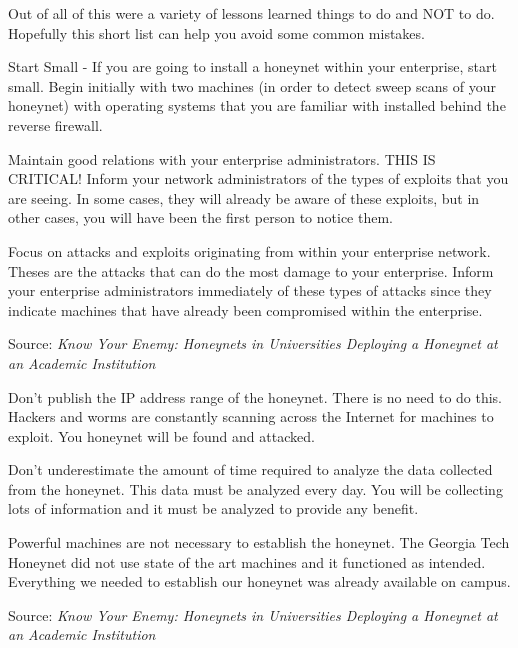 \documentclass[Screen16to9,17pt]{foils}
\begin{document}
Out of all of this were a variety of lessons learned things to do and NOT to do. Hopefully this short list can help you avoid some common mistakes.
\begin{list2}
\item Start Small - If you are going to install a honeynet within your enterprise, start small. Begin initially with two machines (in order to detect sweep scans of your honeynet) with operating systems that you are familiar with installed behind the reverse firewall.
\item Maintain good relations with your enterprise administrators. THIS IS CRITICAL! Inform your network administrators of the types of exploits that you are seeing. In some cases, they will already be aware of these exploits, but in other cases, you will have been the first person to notice them.
\item Focus on attacks and exploits originating from within your enterprise network. Theses are the attacks that can do the most damage to your enterprise. Inform your enterprise administrators immediately of these types of attacks since they indicate machines that have already been compromised within the enterprise.
\end{list2}


Source: \emph{Know Your Enemy: Honeynets in Universities Deploying a Honeynet at an Academic Institution}

\begin{list2}
\item Don't publish the IP address range of the honeynet. There is no need to do this. Hackers and worms are constantly scanning across the Internet for machines to exploit. You honeynet will be found and attacked.
\item Don't underestimate the amount of time required to analyze the data collected from the honeynet. This data must be analyzed every day. You will be collecting lots of information and it must be analyzed to provide any benefit.
\item Powerful machines are not necessary to establish the honeynet. The Georgia Tech Honeynet did not use state of the art machines and it functioned as intended. Everything we needed to establish our honeynet was already available on campus.
\end{list2}

Source: \emph{Know Your Enemy: Honeynets in Universities Deploying a Honeynet at an Academic Institution}
\end{document}

